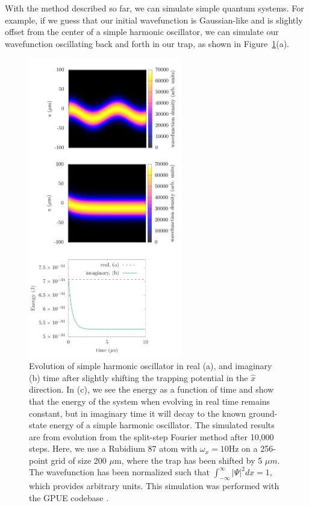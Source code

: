 With the method described so far, we can simulate simple quantum systems.
For example, if we guess that our initial wavefunction is Gaussian-like and is slightly offset from the center of a simple harmonic oscillator, we can simulate our wavefunction oscillating back and forth in our trap, as shown in Figure~\ref{fig:evolve}(a).

\begin{figure}

\center \includegraphics[width=0.6\textwidth]{data/splitop/SHO/SHO_gimp.pdf}

\caption{Evolution of simple harmonic oscillator in real (a), and imaginary (b) time after slightly shifting the trapping potential in the $\hat x$ direction.
In (c), we see the energy as a function of time and show that the energy of the system when evolving in real time remains constant, but in imaginary time it will decay to the known ground-state energy of a simple harmonic oscillator.
The simulated results are from evolution from the split-step Fourier method after 10,000 steps.
Here, we use a Rubidium 87 atom with $\omega_x = 10$Hz on a 256-point grid of size 200 $\mu$m, where the trap has been shifted by 5 $\mu m$.
The wavefunction has been normalized such that $\int_{-\infty}^\infty|\Psi|^2 dx = 1$, which provides arbitrary units.
This simulation was performed with the GPUE codebase \cite{schloss2018}.
}
\label{fig:evolve}
\end{figure}

